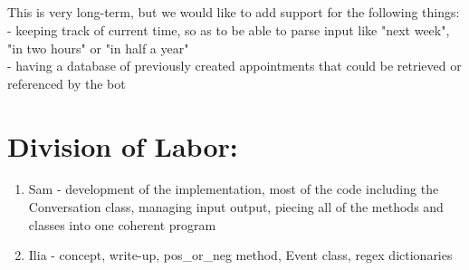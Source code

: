 \documentclass{article} %
\begin{document}
\subsection{}
This is very long-term, but we would like to add support for the following
things: \\
- keeping track of current time, so as to be able to parse input like "next
week", "in two hours" or "in half a year" \\
- having a database of previously created appointments that could be retrieved
or referenced by the bot\\

\section{Division of Labor:}
\begin{enumerate}
\item
Sam - development of the implementation, most of the code including the 
Conversation class, managing input output, piecing all of the methods and 
classes into one coherent program
\item
Ilia - concept, write-up, pos\_or\_neg method, Event class, regex dictionaries
\end{enumerate}
\end{document}
